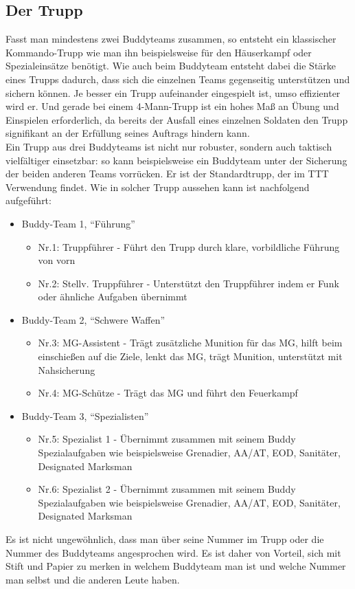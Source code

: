 \subsection{Der Trupp}
Fasst man mindestens zwei Buddyteams zusammen, so entsteht ein klassischer Kommando-Trupp wie man ihn beispielsweise für den Häuserkampf oder Spezialeinsätze benötigt. Wie auch beim Buddyteam entsteht dabei die Stärke eines Trupps dadurch, dass sich die einzelnen Teams gegenseitig unterstützen und sichern können. Je besser ein Trupp aufeinander eingespielt ist, umso effizienter wird er. Und gerade bei einem 4-Mann-Trupp ist ein hohes Maß an Übung und Einspielen erforderlich, da bereits der Ausfall eines einzelnen Soldaten den Trupp signifikant an der Erfüllung seines Auftrags hindern kann.
\\Ein Trupp aus drei Buddyteams ist nicht nur robuster, sondern auch taktisch vielfältiger einsetzbar: so kann beispielsweise ein Buddyteam unter der Sicherung der beiden anderen Teams vorrücken. Er ist der Standardtrupp, der im TTT Verwendung findet. Wie in solcher Trupp aussehen kann ist nachfolgend aufgeführt:
\begin{itemize}
	\item Buddy-Team 1, “Führung” 
	\begin{itemize}	
		\item Nr.1: Truppführer -  Führt den Trupp durch klare, vorbildliche Führung von vorn
		\item Nr.2: Stellv. Truppführer - Unterstützt den Truppführer indem er Funk oder ähnliche Aufgaben übernimmt
	\end{itemize}
\end{itemize}
\begin{itemize}
	\item Buddy-Team 2, “Schwere Waffen” 
	\begin{itemize}
		\item Nr.3: MG-Assistent - Trägt zusätzliche Munition für das MG, hilft beim einschießen auf die Ziele, lenkt das MG, trägt Munition, unterstützt mit Nahsicherung
		\item Nr.4: MG-Schütze - Trägt das MG und führt den Feuerkampf
	\end{itemize}
\end{itemize}
\begin{itemize}
	\item Buddy-Team 3, “Spezialisten” 
	\begin{itemize} 
		\item Nr.5: Spezialist 1 - Übernimmt zusammen mit seinem Buddy Spezialaufgaben wie beispielsweise Grenadier, AA/AT, EOD, Sanitäter, Designated Marksman
		\item Nr.6: Spezialist 2 - Übernimmt zusammen mit seinem Buddy Spezialaufgaben wie beispielsweise Grenadier, AA/AT, EOD, Sanitäter, Designated Marksman
	\end{itemize}
\end{itemize}
Es ist nicht ungewöhnlich, dass man über seine Nummer im Trupp oder die Nummer des Buddyteams angesprochen wird. Es ist daher von Vorteil, sich mit Stift und Papier zu merken in welchem Buddyteam man ist und welche Nummer man selbst und die anderen Leute haben.